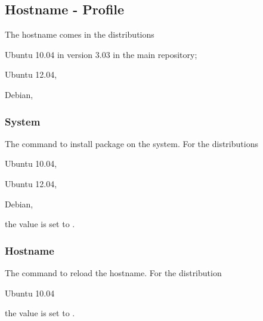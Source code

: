 \subsection{Hostname - Profile}

The hostname comes in the distributions 
\begin{compactitem}
\item[\TheDistribution{ubuntu}] Ubuntu 10.04 in version 3.03 in the main repository;
\item[\TheDistribution{ubuntu}] Ubuntu 12.04,
\item[\TheDistribution{debian}] Debian,
\end{compactitem}

\subsubsection*{System}


The command to install package on the system.
For the distributions 
\begin{inparaitem}
\item[\TheDistribution{ubuntu}] Ubuntu 10.04,
\item[\TheDistribution{ubuntu}] Ubuntu 12.04,
\item[\TheDistribution{debian}] Debian,
\end{inparaitem}
the value is set to .

\subsubsection*{Hostname}


The command to reload the hostname.
For the distribution
\begin{inparaitem}
\item[\TheDistribution{ubuntu}] Ubuntu 10.04
\end{inparaitem}
the value is set to .


